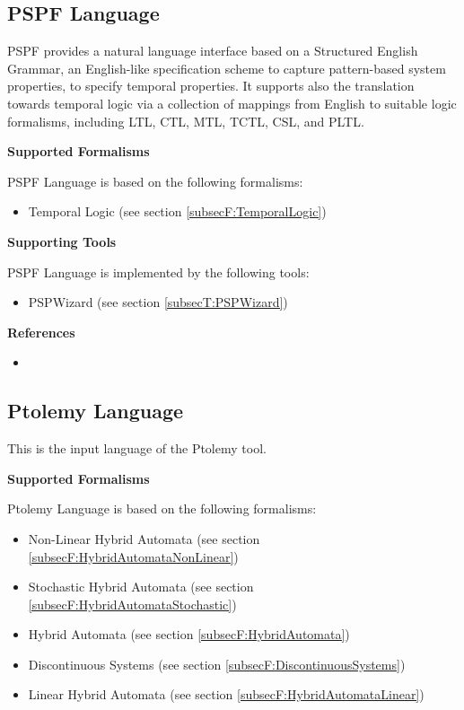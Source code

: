 \subsection{PSPF Language}
\label{subsecL:PSPFramework}


PSPF provides a natural language interface based on a Structured English Grammar, an English-like specification scheme to capture pattern-based system properties, to specify temporal properties.  It supports also the translation towards temporal logic via a collection of mappings from English to suitable logic formalisms, including LTL, CTL, MTL, TCTL, CSL, and PLTL.

\textbf{Supported Formalisms}

PSPF Language is based on the following formalisms:
\begin{itemize}
	\item Temporal Logic (see section \ref{subsecF:TemporalLogic})
\end{itemize}


\textbf{Supporting Tools}

PSPF Language is implemented by the following tools:
\begin{itemize}
	\item PSPWizard (see section \ref{subsecT:PSPWizard})
\end{itemize}


\textbf{References}
\begin{itemize}
	
\item {}
\end{itemize}



\subsection{Ptolemy Language}
\label{subsecL:PtolemyLanguage}


This is the input language of the Ptolemy tool.

\textbf{Supported Formalisms}

Ptolemy Language is based on the following formalisms:
\begin{itemize}
	\item Non-Linear Hybrid Automata (see section \ref{subsecF:HybridAutomataNonLinear})
	\item Stochastic Hybrid Automata (see section \ref{subsecF:HybridAutomataStochastic})
	\item Hybrid Automata (see section \ref{subsecF:HybridAutomata})
	\item Discontinuous Systems (see section \ref{subsecF:DiscontinuousSystems})
	\item Linear Hybrid Automata (see section \ref{subsecF:HybridAutomataLinear})
\end{itemize}


